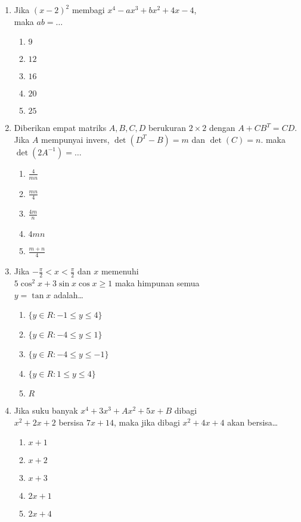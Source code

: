 \documentclass[A4,12PT, english, twocolumn]{journal}
\begin{document}
\begin{enumerate}
\item Jika $(x-2)^2$ membagi $x^4-ax^3+bx^2+4x-4$,\\maka $ab=\dots$
    \begin{enumerate}
        \item $9$
        \item $12$
        \item $16$
        \item $20$
        \item $25$
    \end{enumerate}
    
\item Diberikan empat matriks $A,B,C,D$ berukuran $2\times 2$ dengan $A+CB^T=CD$. Jika $A$ mempunyai invers, $\det (D^T-B)=m$ dan $\det (C)=n$. maka $\det (2A^{-1})=\dots$
    \begin{enumerate}
        \item $\frac{4}{mn}$
        \item $\frac{mn}{4}$
        \item $\frac{4m}{n}$
        \item $4mn$
        \item $\frac{m+n}{4}$
    \end{enumerate}
    
\item Jika $-\frac{\pi}{2}<x<\frac{\pi}{2}$ dan $x$ memenuhi \\ $5\cos^2x+3\sin x \cos x \geq 1$ maka himpunan semua \\ $y=\tan x$ adalah\dots
    \begin{enumerate}
        \item $\{y \in R:-1 \leq y \leq 4\}$
        \item $\{y \in R:-4 \leq y \leq 1\}$
        \item $\{y \in R:-4 \leq y \leq -1\}$
        \item $\{y \in R:1 \leq y \leq 4\}$
        \item $R$
    \end{enumerate}
    
\item Jika suku banyak $x^4+3x^3+Ax^2+5x+B$ dibagi \\ $x^2+2x+2$ bersisa $7x+14$, maka jika dibagi $x^2+4x+4$ akan bersisa\dots
    \begin{enumerate}
        \item $x+1$
        \item $x+2$
        \item $x+3$
        \item $2x+1$
        \item $2x+4$
    \end{enumerate}
    

\end{enumerate}
\end{document}
